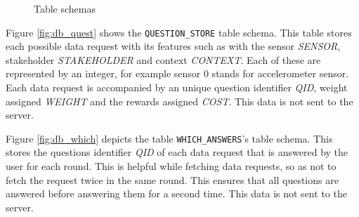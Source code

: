 \begin{figure}[htp]
\hspace{1em}
\caption{Table schemas}
\label{fig:ts1}
\end{figure}

Figure \ref{fig:db_quest} shows the \texttt{QUESTION\_STORE} table schema. This table stores each possible data request with its features such as with the sensor \textit{SENSOR}, stakeholder \textit{STAKEHOLDER} and context \textit{CONTEXT}. Each of these are represented by an integer, for example sensor 0 stands for accelerometer sensor. Each data request is accompanied by
an unique question identifier \textit{QID}, weight assigned \textit{WEIGHT} and the rewards assigned \textit{COST}. This data is not sent to 
the server.

Figure \ref{fig:db_which} depicts the table \texttt{WHICH\_ANSWERS}'s table schema. This stores the questions identifier \textit{QID} of each data request that is answered by the user for each round. This is helpful while fetching data requests, so as not to fetch the request twice in the same round. This ensures that all questions are answered before answering them for a second time. This data is not sent to the server.


